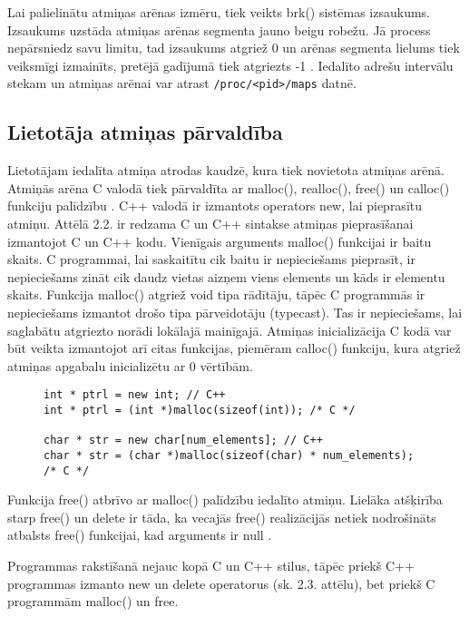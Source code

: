  Lai palielinātu atmiņas arēnas izmēru, tiek veikts brk() sistēmas izsaukums. Izsaukums uzstāda atmiņas arēnas segmenta jauno beigu robežu. 
 Jā process nepārsniedz savu limitu, tad izsaukums atgriež 0 un arēnas segmenta lielums tiek veiksmīgi izmainīts, pretējā gadījumā tiek atgriezts -1 \cite{LINMAN}.
 Iedalīto adrešu intervālu stekam un atmiņas arēnai var atrast \texttt{/proc/<pid>/maps} datnē.
\subsection{Lietotāja atmiņas pārvaldība}
Lietotājam iedalīta atmiņa atrodas kaudzē, kura tiek novietota atmiņas arēnā. 
Atmiņās arēna C valodā tiek pārvaldīta ar malloc(), realloc(), free() un calloc() funkciju palīdzību \cite {atparv}.
C++ valodā ir izmantots operators new, lai pieprasītu atmiņu.   
Attēlā 2.2. ir redzama C un C++ sintakse atmiņas pieprasīšanai izmantojot C un C++ kodu.
Vienīgais arguments malloc() funkcijai ir baitu skaits.
C programmai, lai saskaitītu cik baitu ir nepieciešams pieprasīt, ir nepieciešams zināt cik daudz vietas aizņem viens elements un kāds ir elementu skaits.
Funkcija malloc() atgriež void tipa rādītāju, tāpēc C programmās ir nepieciešams izmantot drošo tipa pārveidotāju (typecast). 
Tas ir nepieciešams, lai saglabātu atgriezto norādi lokālajā mainīgajā. Atmiņas inicializācija C kodā
var būt veikta izmantojot arī citas funkcijas, piemēram calloc() funkciju, kura atgriež atmiņas apgabalu inicializētu ar 0 vērtībām.

\begin{figure}[h]
\begin{lstlisting}
int * ptrl = new int; // C++
int * ptrl = (int *)malloc(sizeof(int)); /* C */

char * str = new char[num_elements]; // C++
char * str = (char *)malloc(sizeof(char) * num_elements); /* C */
\end{lstlisting}
\caption{\textbf{\fontsize{11}{12}\selectfont {Dinamiskās atmiņas iedalīšana C un C++}}}
\end{figure}


Funkcija free() atbrīvo ar malloc() palīdzību iedalīto atmiņu.
Lielāka atšķirība starp free() un delete ir tāda, ka vecajās free() realizācijās netiek nodrošināts atbalsts free() funkcijai, kad arguments ir null \cite{POCF}. 

Programmas rakstīšanā nejauc kopā C un C++ stilus, tāpēc priekš C++ programmas izmanto 
new un delete operatorus (sk. 2.3. attēlu), bet priekš C programmām malloc() un free.


